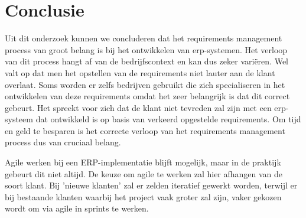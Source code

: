 
\chapter{Conclusie}
\label{ch:conclusie}

Uit dit onderzoek kunnen we concluderen dat het requirements management process van groot belang is bij het ontwikkelen van erp-systemen. Het verloop van dit process hangt af van de bedrijfscontext en kan dus zeker variëren. Wel valt op dat men het opstellen van de requirements niet lauter aan de klant overlaat. Soms worden er zelfs bedrijven gebruikt die zich specialiseren in het ontwikkelen van deze requirements omdat het zeer belangrijk is dat dit correct gebeurt. Het spreekt voor zich dat de klant niet tevreden zal zijn met een erp-systeem dat ontwikkeld is op basis van verkeerd opgestelde requirements. Om tijd en geld te besparen is het correcte verloop van het requirements management process dus van cruciaal belang. 

Agile werken bij een ERP-implementatie blijft mogelijk, maar in de praktijk gebeurt dit niet altijd. De keuze om agile te werken zal hier afhangen van de soort klant. Bij 'nieuwe klanten' zal er zelden iteratief gewerkt worden, terwijl er bij bestaande klanten waarbij het project vaak groter zal zijn, vaker gekozen wordt om via agile in sprints te werken.